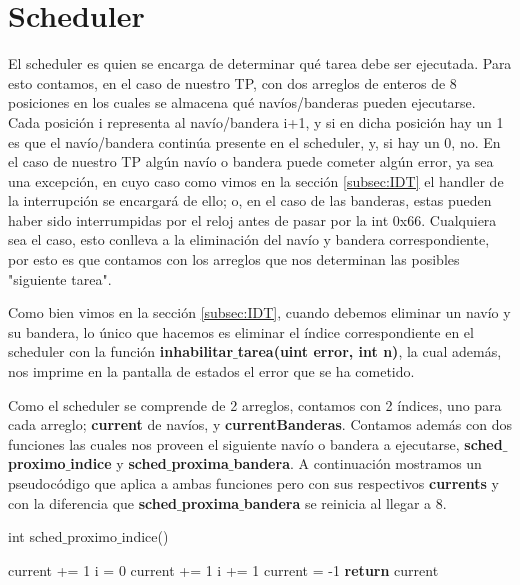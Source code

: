 \section{Scheduler}
\label{subsec:Scheduler}
\par{El scheduler es quien se encarga de determinar qué tarea debe ser ejecutada. Para esto contamos, en el caso de nuestro TP, con dos arreglos de enteros de 8 posiciones en los cuales se almacena qué navíos/banderas pueden ejecutarse. Cada posición i representa al navío/bandera i+1, y si en dicha posición hay un 1 es que el navío/bandera continúa presente en el scheduler, y, si hay un 0, no. En el caso de nuestro TP algún navío o bandera puede cometer algún error, ya sea una excepción, en cuyo caso como vimos en la sección \ref{subsec:IDT} el handler de la interrupción se encargará de ello; o, en el caso de las banderas, estas pueden haber sido interrumpidas por el reloj antes de pasar por la int 0x66. Cualquiera sea el caso, esto conlleva a la eliminación del navío y bandera correspondiente, por esto es que contamos con los arreglos que nos determinan las posibles "siguiente tarea".}
\par{
Como bien vimos en la sección \ref{subsec:IDT}, cuando debemos eliminar un navío y su bandera, lo único que hacemos es eliminar el índice correspondiente en el scheduler con la función \textbf{inhabilitar$\_$tarea(uint error, int n)}, la cual además, nos imprime en la pantalla de estados el error que se ha cometido.
}
\par{Como el scheduler se comprende de 2 arreglos, contamos con 2 índices, uno para cada arreglo; \textbf{current} de navíos, y \textbf{currentBanderas}. Contamos además con dos funciones las cuales nos proveen el siguiente navío o bandera a ejecutarse, \textbf{sched$\_$proximo$\_$indice} y \textbf{sched$\_$proxima$\_$bandera}. A continuación mostramos un pseudocódigo que aplica a ambas funciones pero con sus respectivos \textbf{currents} y con la diferencia que \textbf{sched$\_$proxima$\_$bandera} se reinicia al llegar a 8.}

\begin{algorithm}[h!]
\caption{int sched$\_$proximo$\_$indice()}
\begin{algorithmic}
	\State current += 1
	\State i = 0
		\State current += 1
		\State i += 1
	\EndWhile
	\State current = -1
	\EndIf
	\State \textbf{return} current
\end{algorithmic}
\end{algorithm}

